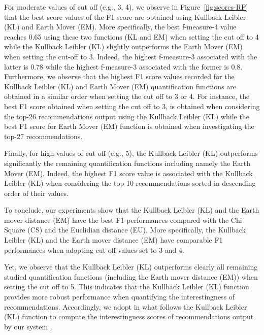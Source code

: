 For moderate values of cut off (e.g., 3, 4), we observe in Figure~\ref{fig:scores-RP} that the best score values of the F1 score are obtained using Kullback Leibler (KL) and Earth Mover (EM). 
More specifically, the best f-measure-4 value reaches 0.65 using these two functions (KL and EM) when setting the cut off to 4 while the Kullback Leibler (KL) slightly outperforms the Earth Mover (EM) when setting the cut-off to 3. Indeed, the highest f-measure-3 associated with the latter is 0.78 while the highest f-measure-3 associated with the former is 0.8.
Furthermore, we observe that the highest F1 score values recorded for the Kullback Leibler (KL) and Earth Mover (EM) quantification functions are obtained in a similar order when setting the cut off to 3 or 4. For instance, the best F1 score obtained when setting the cut off to 3, is obtained when considering the top-26 recommendations output using the Kullback Leibler (KL) while the best F1 score for Earth Mover (EM) function is obtained  when investigating the top-27 recommendations.


Finally, for high values of cut off (e.g., 5), the Kullback Leibler (KL) outperforms significantly the remaining quantification functions including namely the Earth Mover (EM).
Indeed, the highest F1 score value is associated with the Kullback Leibler (KL) when considering the top-10 recommendations sorted in descending order of their values. 













To conclude, our experiments show that the Kullback Leibler (KL) and the Earth mover distance (EM)  have the best F1 performances compared with the Chi Square (CS) and the Euclidian distance (EU). 
 More specifically, the Kullback Leibler (KL) and the Earth mover distance (EM) have comparable F1 performances when adopting cut off values set to 3 and 4.

Yet, we observe that the Kullback Leibler (KL) outperforms clearly all remaining studied quantification functions (including the  Earth mover distance (EM)) when setting the cut off to 5.
 This indicates that the Kullback Leibler (KL) function provides more robust performance when quantifying the interestingness of recommendations. Accordingly, we adopt in what follows the Kullback Leibler (KL) function to compute the interestingness scores of recommendations %
 output by our system \prototype{}. 








